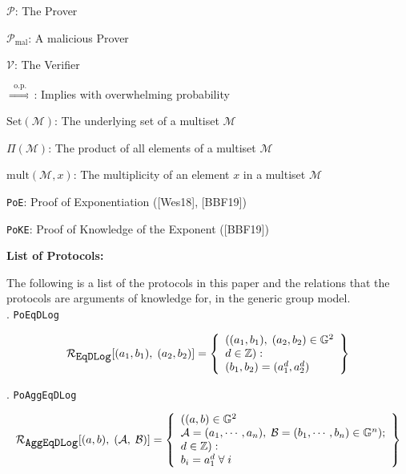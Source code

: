 \documentclass[11pt, lettersize, notitlepage, leqno, footskip=0.6cm]{article}
\newcommand{\sett}{\mr{Set}}
\newcommand{\impop}{\overset{\;\;\mr{o.p.}\;\;}{\Longrightarrow}}
\newcommand{\mc}{\mathcal}
\newcommand{\mb}{\mathbb}
\newcommand{\mr}{\mathrm}
\newcommand{\noin}{\noindent}
\numberwithin{equation}{section}
\begin{document}
{\noin $\mc{P}$: The Prover \vspace{0.1cm}

\noin $\mc{P}_{\mr{mal}}$: A malicious Prover \vspace{0.1cm}

\noin $\mc{V}$: The Verifier \vspace{0.1cm}

\noin $\impop$: Implies with overwhelming probability \vspace{0.1cm}

\noin $\sett(\mc{M})$: The underlying set of a multiset $\mc{M}$ \vspace{0.1cm}

\noin $\Pi(\mc{M})$: The product of all elements of a multiset $\mc{M}$ \vspace{0.1cm}

\noin $\mr{mult}(\mc{M},x)$: The multiplicity of an element $x$ in a multiset $\mc{M}$ \vspace{0.1cm}

\noin \verb|PoE|: Proof of Exponentiation ([Wes18], [BBF19])

\noin \verb|PoKE|: Proof of Knowledge of the Exponent ([BBF19])

\bigskip \begin{center} \textbf{List of Protocols:}




\end{center}

The following is a list of the protocols in this paper and the relations that the protocols are arguments of knowledge for, in the generic group model.\\

\noin 1. \verb|PoEqDLog| \vspace{-0.3cm}

\[
  \mc{R}_{{\protect\verb|EqDLog|}}[(a_1, b_1),\;(a_2,b_2)] = \left\{\begin{array}{l}
    ((a_1, b_1), \; (a_2,b_2)\in\mb{G}^2\\
    d\in\mb{Z}): \\
    (b_1,b_2) = (a_1^d,a_2^d)
  \end{array}\right\}
\]

\noin 2. \verb|PoAggEqDLog| \vspace{-0.3cm}

\[
  \mc{R}_{{\protect\verb|AggEqDLog|}}[(a, b),\;(\mc{A},\;\mc{B})] = \left\{\begin{array}{l}
  	((a, b)\in\mb{G}^2\\
    \mc{A} = (a_1, \cdots, a_n),\;\mc{B} = (b_1,\cdots, b_n)\in\mb{G}^n);\\
    d\in\mb{Z}): \\
    b_i = a_1^{d} \;\forall\;i
  \end{array}\right\}
\]
 

}
\end{document}
